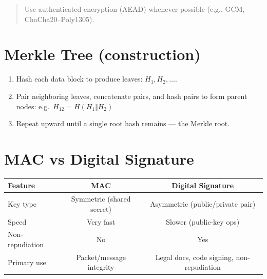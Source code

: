 \documentclass[12pt]{article}
\begin{document}
\begin{quote}
Use authenticated encryption (AEAD) whenever possible (e.g., GCM, ChaCha20--Poly1305).
\end{quote}

\hrulefill

\section{Merkle Tree (construction)}
\begin{enumerate}[label=\arabic*.]
  \item Hash each data block to produce leaves: $H_1, H_2, \ldots$.
  \item Pair neighboring leaves, concatenate pairs, and hash pairs to form parent nodes: e.g.\ $H_{12} = H( H_1 \Vert H_2 )$
  \item Repeat upward until a single root hash remains --- the Merkle root.
\end{enumerate}

\hrulefill

\section{MAC vs Digital Signature}
\begin{center}
\begin{tabular}{@{}lcc@{}}
\toprule
\textbf{Feature} & \textbf{MAC} & \textbf{Digital Signature} \\
\midrule
Key type & Symmetric (shared secret) & Asymmetric (public/private pair) \\
Speed & Very fast & Slower (public-key ops) \\
Non-repudiation & No & Yes \\
Primary use & Packet/message integrity & Legal docs, code signing, non-repudiation \\
\bottomrule
\end{tabular}
\end{center}

\hrulefill
\end{document}
